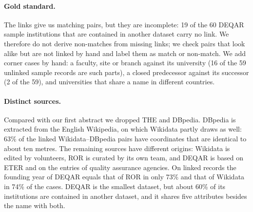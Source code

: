 \documentclass[runningheads,a4paper]{llncs}
\begin{document}
\paragraph{Gold standard.}
The links give us matching pairs, but they are incomplete: 19 of the 60 DEQAR sample
institutions that are contained in another dataset carry no link. We therefore do not derive
non-matches from missing links; we check pairs that look alike but are not linked by hand and
label them as match or non-match. We add corner cases by hand: a faculty, site or branch against
its university (16 of the 59 unlinked sample records are such parts), a closed predecessor
against its successor (2 of the 59), and universities that share a name in different countries.

\paragraph{Distinct sources.}
Compared with our first abstract we dropped THE and DBpedia. DBpedia is extracted from the
English Wikipedia, on which Wikidata partly draws as well: 63\% of the linked Wikidata--DBpedia
pairs have coordinates that are identical to about ten metres. The remaining sources have
different origins: Wikidata is edited by volunteers, ROR is curated by its own team, and DEQAR
is based on ETER and on the entries of quality assurance agencies. On linked records the
founding year of DEQAR equals that of ROR in only 73\% and that of Wikidata in 74\% of the cases.
DEQAR is the smallest dataset, but about 60\% of its institutions are contained in another
dataset, and it shares five attributes besides the name with both.
\end{document}
